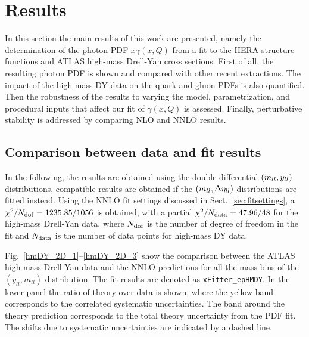 \section{Results}
\label{sec:results}

In this section the main results of this work are presented, namely the
determination of the photon PDF $x\gamma(x,Q)$ from a fit to the
HERA structure functions and ATLAS high-mass Drell-Yan cross sections.
%
First of all, the resulting photon PDF is shown and compared with other
recent extractions.
%
The impact of the high mass DY data on
the quark and gluon PDFs is also quantified.
%
Then the robustness of the results to varying the model, parametrization, and procedural
inputs that affect our fit of $\gamma(x,Q)$ is assessed.
%
Finally, perturbative stability is addressed by comparing NLO and
NNLO results.

\subsection{Comparison between data and fit results}

In the following, the results are obtained using the
double-differential $\left( m_{ll},y_{ll}\right)$ distributions, compatible results are obtained if the
$\left( m_{ll},\Delta\eta_{ll}\right)$ distributions are fitted instead.
%
Using the NNLO fit settings discussed in Sect.~\ref{sec:fitsettings},
a $\chi^{2}/N_{\rm dof} = 1235.85/1056$ is obtained, with a partial
$\chi^2/N_{\rm data} = 47.96/48$ for the high-mass Drell-Yan data,
where $N_{\rm dof}$ is the number of degree of freedom in the fit and 
$N_{\rm data}$  is the number of data points for high-mass DY data.

Fig.~\ref{hmDY_2D_1}--\ref{hmDY_2D_3} show the comparison between the ATLAS
high-mass Drell Yan data and the NNLO predictions for all the mass
bins of the $(y_{ll},m_{ll})$ distribution.
%
The fit results are denoted as {\tt xFitter\_epHMDY}.
%
In the lower panel the ratio of theory over data is shown, where the
yellow band corresponds to the correlated systematic uncertainties.
%
The band around the theory prediction corresponds to the total theory
uncertainty from the PDF fit. 
%
The shifts due to systematic uncertainties are indicated by a dashed
line.


